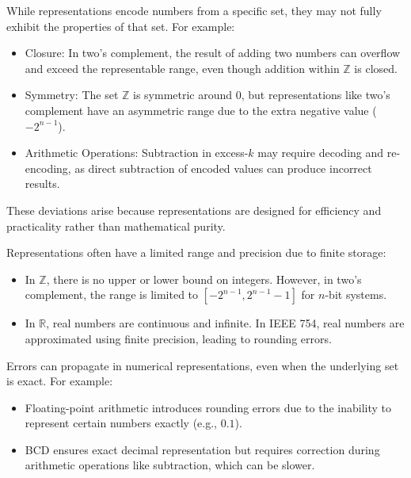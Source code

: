 While representations encode numbers from a specific set, they may not fully exhibit the properties of that set. For example:

\begin{itemize}
    \item Closure: In two's complement, the result of adding two numbers can overflow and exceed the representable range, even though addition within \( \mathbb{Z} \) is closed.
    \item Symmetry: The set \( \mathbb{Z} \) is symmetric around \( 0 \), but representations like two's complement have an asymmetric range due to the extra negative value (\( -2^{n-1} \)).
    \item Arithmetic Operations: Subtraction in excess-\( k \) may require decoding and re-encoding, as direct subtraction of encoded values can produce incorrect results.
\end{itemize}

These deviations arise because representations are designed for efficiency and practicality rather than mathematical purity.

Representations often have a limited range and precision due to finite storage:
\begin{itemize}
    \item In \( \mathbb{Z} \), there is no upper or lower bound on integers. However, in two's complement, the range is limited to \( [-2^{n-1}, 2^{n-1} - 1] \) for \( n \)-bit systems.
    \item In \( \mathbb{R} \), real numbers are continuous and infinite. In IEEE 754, real numbers are approximated using finite precision, leading to rounding errors.
\end{itemize}

Errors can propagate in numerical representations, even when the underlying set is exact. For example:
\begin{itemize}
    \item Floating-point arithmetic introduces rounding errors due to the inability to represent certain numbers exactly (e.g., \( 0.1 \)).
    \item BCD ensures exact decimal representation but requires correction during arithmetic operations like subtraction, which can be slower.
\end{itemize}

